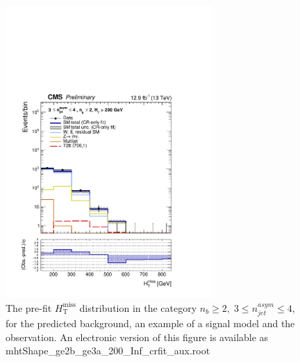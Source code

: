 \clearpage
\begin{figure}[tbhp]
    \caption{ 
    The pre-fit $H_{\mathrm{T}}^{\mathrm{miss}}$ distribution in the category $n_{b}\geq 2, \; 3 \leq n_{jet}^{asym} \leq 4$, 
    for the predicted background, an example of a signal model and the observation.
    An electronic version of this figure is available as mhtShape\_ge2b\_ge3a\_200\_Inf\_crfit\_aux.root
    \label{fig:mhtShape_ge2b_ge3a_crfit} }
  \begin{center}
  \includegraphics[width=0.7\textwidth]{mhtShape_ge2b_ge3a_200_Inf_crfit_aux}
  \end{center}
\end{figure}


